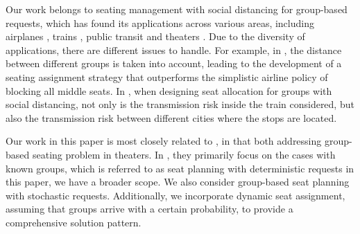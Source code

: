 Our work belongs to seating management with social distancing for group-based requests, which has found its applications across various areas, including airplanes \cite{salari2022social}, trains \cite{haque2023social}, public transit \cite{moore2021seat} and theaters \cite{blom2022filling}. Due to the diversity of applications, there are different issues to handle. For example, in \cite{salari2022social}, the distance between different groups is taken into account, leading to the development of a seating assignment strategy that outperforms the simplistic airline policy of blocking all middle seats. In \cite{haque2023social}, when designing seat allocation for groups with social distancing, not only is the transmission risk inside the train considered, but also the transmission risk between different cities where the stops are located. 

Our work in this paper is most closely related to \cite{blom2022filling}, in that both addressing group-based seating problem in theaters. In \cite{blom2022filling}, they primarily focus on the cases with known groups, which is referred to as seat planning with deterministic requests in this paper, we have a broader scope. We also consider group-based seat planning with stochastic requests. Additionally, we incorporate dynamic seat assignment, assuming that groups arrive with a certain probability, to provide a comprehensive solution pattern.





